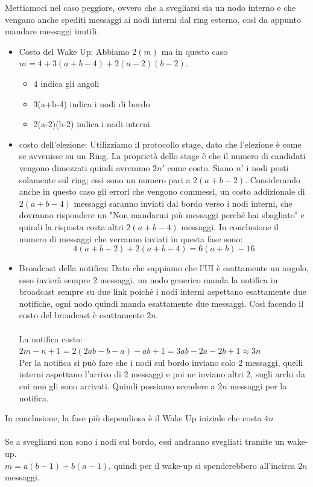 Mettiamoci nel caso peggiore, ovvero che a svegliarsi sia un nodo interno e che
vengano anche spediti messaggi ai nodi interni dal ring esterno, così da appunto
mandare messaggi inutili.
\begin{itemize}
    \item Costo del Wake Up: Abbiamo $2(m)$ ma in questo caso $m =
              4+3(a+b-4)+2(a-2)(b-2)$.
          \begin{itemize}
              \item $4$ indica gli angoli
              \item 3(a+b-4) indica i nodi di bordo
              \item 2(a-2)(b-2) indica i nodi interni
          \end{itemize}
    \item costo dell'elezione: Utilizziamo il protocollo stage, dato che
          l'elezione è come se avvenisse su un Ring. La proprietà dello stage è che il
          numero di candidati vengono dimezzati quindi avremmo $2n'$ come costo. Siano
          $n'$ i nodi posti solamente sul ring; essi sono un numero pari a $2(a+b-2)$.
          Considerando anche in questo caso gli errori che vengono commessi, un costo
          addizionale di $2(a+b-4)$ messaggi saranno inviati dal bordo verso i nodi
          interni, che dovranno rispondere un "Non mandarmi più messaggi perché hai
          sbagliato" e quindi la risposta costa altri $2(a+b-4)$ messaggi. In
          conclusione il numero di messaggi che verranno inviati in questa fase sono:
          $$4(a+b-2)+2(a+b-4) = 6(a+b)-16$$
    \item Broadcast della notifica: Dato che sappiamo che l'UI è esattamente un
          angolo, esso invierà sempre 2 messaggi. un nodo generico manda la notifica in
          broadcast sempre su due link poiché i nodi interni aspettano esattamente due
          notifiche, ogni nodo quindi manda esattamente due messaggi. Così facendo il
          costo del broadcast è esattamente $2n$.\\\\La notifica costa: $2m - n +1 = 2
              (2ab -b-a) -ab +1 = 3ab-2a-2b+1 \approx 3n$\\
          Per la notifica si può fare che i nodi sul bordo inviano solo 2
          messaggi, quelli interni aspettano l'arrivo di 2 messaggi e poi ne
          inviano altri 2, sugli archi da cui non gli sono arrivati. Quindi
          possiamo scendere a $2n$ messaggi per la notifica.
\end{itemize}
In conclusione, la fase più dispendiosa è il Wake Up iniziale che costa $4n$\\\\
Se a svegliarsi non sono i nodi sul bordo, essi andranno svegliati tramite un
wake-up.\\
$m = a(b-1) + b(a-1)$, quindi per il wake-up si spenderebbero all'incirca $2n$
messaggi.

